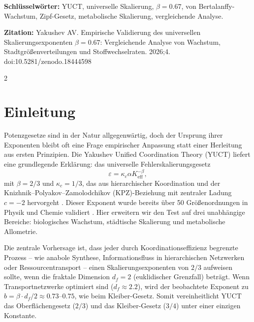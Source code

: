 \documentclass[11pt,a4paper]{article}
\newcommand{\eps}{\varepsilon}
\newcommand{\kappac}{\kappa_c}
\newcommand{\Keff}{K_{\mathrm{eff}}}
\newcommand{\betaf}{\beta}
\newcommand{\df}{d_f}
\begin{document}
	\vspace{0.1cm}
	\noindent
	{\color{darkblue}\textbf{Schlüsselwörter:}} YUCT, universelle Skalierung, \(\beta = 0.67\), von Bertalanffy-Wachstum, Zipf-Gesetz, metabolische Skalierung, vergleichende Analyse.
	
	\vspace{0.1cm}
	\noindent
	{\color{darkblue}\textbf{Zitation:}} Yakushev AV. Empirische Validierung des universellen Skalierungsexponenten \(\beta = 0.67\): Vergleichende Analyse von Wachstum, Stadtgrößenverteilungen und Stoffwechselraten. 2026;4. doi:10.5281/zenodo.18444598
	
	\vspace{0.4cm}
	\vspace*{-\baselineskip}
	\begin{multicols}{2}
		
		\section{Einleitung}
		
		Potenzgesetze sind in der Natur allgegenwärtig, doch der Ursprung ihrer Exponenten bleibt oft eine Frage empirischer Anpassung statt einer Herleitung aus ersten Prinzipien. Die Yakushev Unified Coordination Theory (YUCT) liefert eine grundlegende Erklärung: das universelle Fehlerskalierungsgesetz
		\[
		\eps = \kappac \alpha \Keff^{-\betaf},
		\]
		mit \(\betaf = 2/3\) und \(\kappac = 1/3\), das aus hierarchischer Koordination und der Knizhnik–Polyakov–Zamolodchikov (KPZ)-Beziehung mit zentraler Ladung \(c = -2\) hervorgeht \cite{AppendixY, AppendixL}. Dieser Exponent wurde bereits über 50 Größenordnungen in Physik und Chemie validiert \cite{AppendixC, AppendixG}. Hier erweitern wir den Test auf drei unabhängige Bereiche: biologisches Wachstum, städtische Skalierung und metabolische Allometrie.
		
		Die zentrale Vorhersage ist, dass jeder durch Koordinationseffizienz begrenzte Prozess – wie anabole Synthese, Informationsfluss in hierarchischen Netzwerken oder Ressourcentransport – einen Skalierungsexponenten von \(2/3\) aufweisen sollte, wenn die fraktale Dimension \(\df = 2\) (euklidischer Grenzfall) beträgt. Wenn Transportnetzwerke optimiert sind (\(\df \approx 2.2\)), wird der beobachtete Exponent zu \(b = \betaf \cdot \df/2 \approx 0.73\)–\(0.75\), wie beim Kleiber-Gesetz. Somit vereinheitlicht YUCT das Oberflächengesetz (\(2/3\)) und das Kleiber-Gesetz (\(3/4\)) unter einer einzigen Konstante.
		

\end{multicols}
\end{document}
